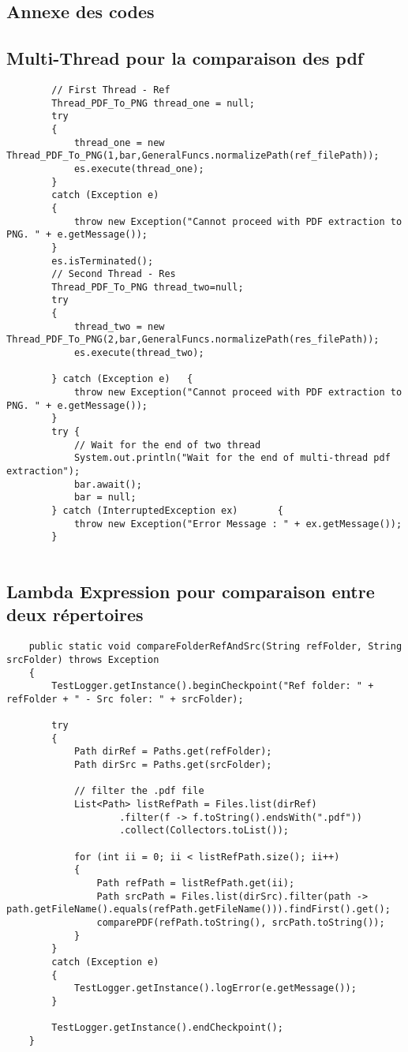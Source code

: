 
\begin{appendix}
\section{Annexe des codes}
    \subsection{Multi-Thread pour la comparaison des pdf}
    \label{appendix: multi-thread_compare_pdf}
    \begin{lstlisting}
    	// First Thread - Ref
		Thread_PDF_To_PNG thread_one = null;		
		try
		{
			thread_one = new Thread_PDF_To_PNG(1,bar,GeneralFuncs.normalizePath(ref_filePath));
			es.execute(thread_one);			
		}
		catch (Exception e)
		{
			throw new Exception("Cannot proceed with PDF extraction to PNG. " + e.getMessage());
		}
		es.isTerminated();
		// Second Thread - Res
		Thread_PDF_To_PNG thread_two=null;
		try
		{
			thread_two = new Thread_PDF_To_PNG(2,bar,GeneralFuncs.normalizePath(res_filePath));
			es.execute(thread_two);
			
		} catch (Exception e)	{
			throw new Exception("Cannot proceed with PDF extraction to PNG. " + e.getMessage());
		}
		try	{
			// Wait for the end of two thread
			System.out.println("Wait for the end of multi-thread pdf extraction");
			bar.await(); 
			bar = null;
		} catch (InterruptedException ex)		{ 
			throw new Exception("Error Message : " + ex.getMessage());
		}
    
    \end{lstlisting}
    
    \newpage
    \subsection{Lambda Expression pour comparaison entre deux répertoires}
    \label{appendix:lambda_compare_towFolder}
    \begin{lstlisting}
	public static void compareFolderRefAndSrc(String refFolder, String srcFolder) throws Exception
	{
		TestLogger.getInstance().beginCheckpoint("Ref folder: " + refFolder + " - Src foler: " + srcFolder);
		
		try
		{
			Path dirRef = Paths.get(refFolder);
			Path dirSrc = Paths.get(srcFolder);
			
			// filter the .pdf file
			List<Path> listRefPath = Files.list(dirRef)
					.filter(f -> f.toString().endsWith(".pdf"))
					.collect(Collectors.toList());
			
			for (int ii = 0; ii < listRefPath.size(); ii++)
			{
				Path refPath = listRefPath.get(ii);
				Path srcPath = Files.list(dirSrc).filter(path -> path.getFileName().equals(refPath.getFileName())).findFirst().get();
				comparePDF(refPath.toString(), srcPath.toString());
			}
		}
		catch (Exception e)
		{
			TestLogger.getInstance().logError(e.getMessage());
		}
		
		TestLogger.getInstance().endCheckpoint();
	}
    \end{lstlisting}
\end{appendix}